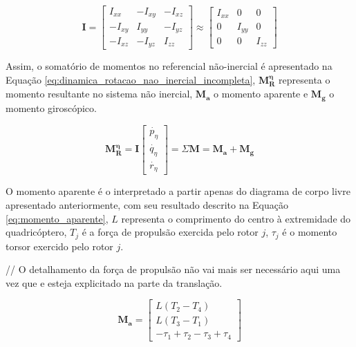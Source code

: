 \documentclass[main.tex]{subfiles}
\begin{document}
\begin{equation}\label{eq:tensor_inercia}
	\boldsymbol{I} = \begin{bmatrix}
		I_{xx} & -I_{xy} & -I_{xz}\\
		-I_{xy} &  I_{yy} & -I_{yz}\\
		-I_{xz} & -I_{yz} & I_{zz}
	\end{bmatrix} \approx \begin{bmatrix}
	I_{xx} 	& 0 		& 0\\
	0 		&  I_{yy} 	& 0\\
	0 		& 0 		& I_{zz}
	\end{bmatrix}
\end{equation}

Assim, o somatório de momentos no referencial não-inercial é apresentado na Equação \ref{eq:dinamica_rotacao_nao_inercial_incompleta}, $	\boldsymbol{M^\eta_R}$ representa o momento resultante no sistema não inercial, $\boldsymbol{M_a}$ o momento aparente e $\boldsymbol{M_g}$ o momento giroscópico.

\begin{equation}\label{eq:dinamica_rotacao_nao_inercial_incompleta}
	\boldsymbol{M^\eta_R} = \boldsymbol{I} \begin{bmatrix}
		\dot{p_\eta}\\
		\dot{q_\eta}\\
		\dot{r_\eta}
	\end{bmatrix} = \Sigma \boldsymbol{M} = \boldsymbol{M_a} + \boldsymbol{M_g}
\end{equation}

O momento aparente é o interpretado a partir apenas do diagrama de corpo livre apresentado anteriormente, com seu resultado descrito na Equação \ref{eq:momento_aparente}, $L$ representa o comprimento do centro à extremidade do quadricóptero, $T_j$ é a força de propulsão exercida pelo rotor $j$, $\tau_j$ é o momento torsor exercido pelo rotor $j$.

\textcolor{corrigir}{// O detalhamento da força de propulsão não vai mais ser necessário aqui uma vez que e esteja explicitado na parte da translação.}

\begin{equation}\label{eq:momento_aparente}
	\boldsymbol{M_a} =
	\begin{bmatrix}
		L (T_2 - T_4)\\
		L (T_3 - T_1)\\
		-\tau_1 + \tau_2 - \tau_3 + \tau_4
	\end{bmatrix}
\end{equation}
\end{document}
